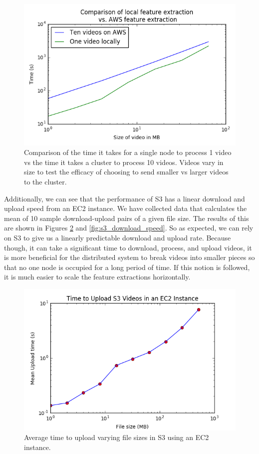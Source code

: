\begin{figure}[h]
  \centering
  \includegraphics[width=.9\textwidth]{figures/aws_vs_local.png}
  \caption{Comparison of the time it takes for a single node to process 1 video
  vs the time it takes a cluster to process 10 videos. Videos vary in size to
  test the efficacy of choosing to send smaller vs larger videos to the cluster.}
  \label{fig:size_matters}
\end{figure}

Additionally, we can see that the performance of S3 has a linear download and upload
speed from an EC2 instance. We have collected data that calculates the mean of 10
sample download-upload pairs of a given file size. The results of this are shown
in Figures \ref{fig:s3_upload_speed} and \ref{fig:s3_download_speed}. So as expected,
we can rely on S3 to give us a linearly predictable download and upload rate.
Because though, it can take a significant time to download, process, and upload videos,
it is more beneficial for the distributed system to break videos into smaller
pieces so that no one node is occupied for a long period of time. If this
notion is followed, it is much easier to scale the feature extractions horizontally.

\begin{figure}[h]
  \centering
  \includegraphics[width=.8\textwidth]{figures/s3_upload_speed}
  \caption{Average time to upload varying file sizes in S3 using an EC2 instance. }
  \label{fig:s3_upload_speed}
\end{figure}


